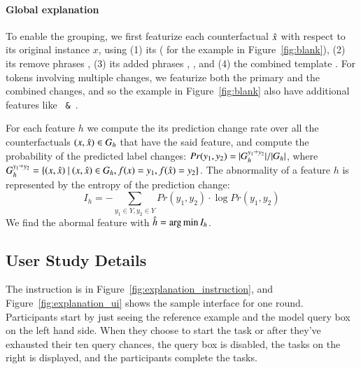 \paragraph{Global explanation}
To enable the grouping, we first featurize each counterfactual $\hat{x}$ with respect to its original instance $x$, using 
(1) its \tagstr ( for the example in Figure~\ref{fig:blank}), 
(2) its remove phrases , 
(3) its added phrases , , and 
(4) the combined template .
For tokens involving multiple changes, we featurize both the primary and the combined changes, and so the example in Figure~\ref{fig:blank} also have additional features like \texttt{ \& }.

For each feature $h$ we compute the its prediction change rate over all the counterfactuals $(x, \hat{x}) \in G_{h}$ that have the said feature, and compute the probability of the predicted label changes: $Pr(y_1, y_2) = |G_h^{y_1\veryshortarrow y_2}|/|G_h|$, where $ G_h^{y_1\veryshortarrow y_2} = \{ (x, \xp)\ |\ (x, \xp) \in G_h, f(x)=y_1, f(\xp) = y_2 \}$.
The abnormality of a feature $h$ is represented by the entropy of the prediction change:
$$I_h = -\sum_{y_1 \in Y, y_2 \in Y} Pr(y_1, y_2) \cdot \log Pr(y_1, y_2)$$
We find the abormal feature with $\hat{h} = \operatorname*{arg\,min} I_h$.



\subsection{User Study Details}
\label{appendix:exp_user_study}

The instruction is in Figure~\ref{fig:explanation_instruction}, and Figure~\ref{fig:explanation_ui} shows the sample interface for one round. 
Participants start by just seeing the reference example and the model query box on the left hand side.
When they choose to start the task or after they've exhausted their ten query chances, the query box is disabled, the tasks on the right is displayed, and the participants complete the tasks.